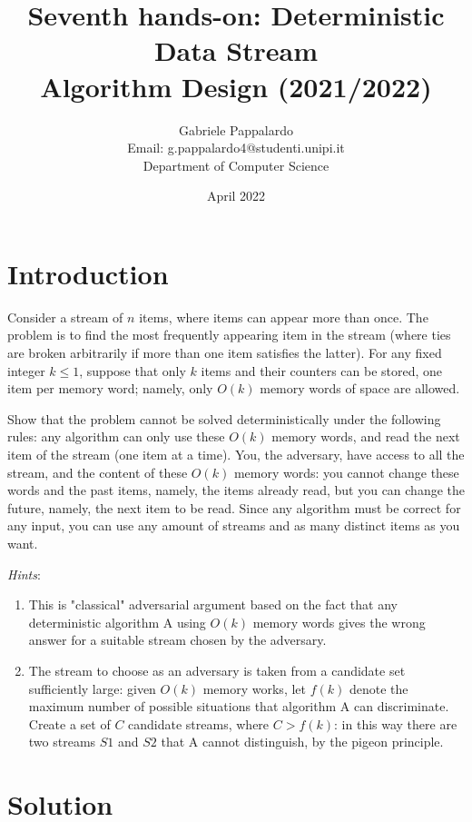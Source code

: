 \documentclass{article}
\title{Seventh hands-on: Deterministic Data Stream \\[1ex] \large Algorithm Design (2021/2022)}
\author{Gabriele Pappalardo\\Email: g.pappalardo4@studenti.unipi.it\\Department of Computer Science}
\date{April 2022}
\begin{document}
\maketitle

\section{Introduction}

Consider a stream of $n$ items, where items can appear more than once. The problem is to find the most frequently appearing item in the stream (where ties are broken arbitrarily if more than one item satisfies the latter). 
For any fixed integer $k \le 1$, suppose that only $k$ items and their counters can be stored, one item per memory word; namely, 
only $O(k)$ memory words of space are allowed. 
\newline

\noindent Show that the problem cannot be solved deterministically under the following rules: any algorithm can only use these $O(k)$ memory words, and read the next item of the stream (one item at a time). 
You, the adversary, have access to all the stream, and the content of these $O(k)$ memory words: 
you cannot change these words and the past items, namely, the items already read, but you can change the future, 
namely, the next item to be read. Since any algorithm must be correct for any input, you can use any amount of streams and as many distinct items as you want.  
\newline

\noindent \textit{Hints}:
\begin{enumerate}
    \item This is "classical" adversarial argument based on the fact that any deterministic algorithm A using $O(k)$ memory words gives the wrong answer for a suitable stream chosen by the adversary. 
    \item The stream to choose as an adversary is taken from a candidate set sufficiently large: given $O(k)$ memory works, let $f(k)$ denote the maximum number of possible situations that algorithm A can discriminate. Create a set of $C$ candidate streams, where $C > f(k)$: in this way there are two streams $S1$ and $S2$ that A cannot distinguish, by the pigeon principle. 
\end{enumerate}

\section{Solution}
\end{document}
